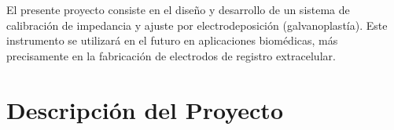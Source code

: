 El presente proyecto consiste en el diseño y desarrollo de un sistema de calibración de impedancia y ajuste por electrodeposición (galvanoplastía). Este instrumento se utilizará en el futuro en aplicaciones biomédicas, más precisamente en la fabricación de electrodos de registro extracelular.



\section{Descripción del Proyecto}

